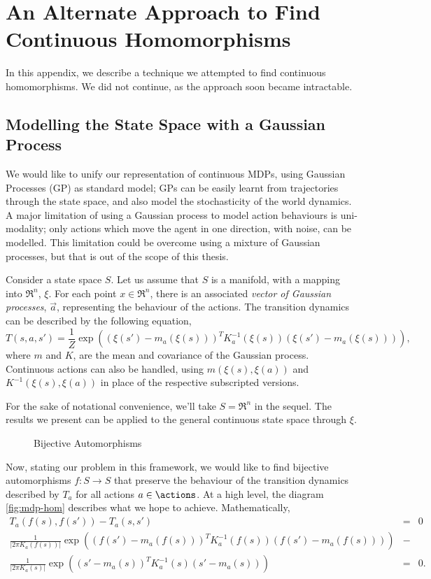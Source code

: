 \chapter{An Alternate Approach to Find Continuous Homomorphisms}
\label{chap:alt-hom-approaches}

In this appendix, we describe a technique we attempted to find
continuous homomorphisms. We did not continue, as the approach soon
became intractable.

\section{Modelling the State Space with a Gaussian Process}

We would like to unify our representation of continuous MDPs, using
Gaussian Processes (GP) as standard model; GPs can be easily learnt from
trajectories through the state space, and also model the stochasticity
of the world dynamics. A major limitation of using a Gaussian process to
model action behaviours is uni-modality; only actions which move the
agent in one direction, with noise, can be modelled. This limitation
could be overcome using a mixture of Gaussian processes, but that is out
of the scope of this thesis.

Consider a state space $S$. Let us assume that $S$ is a manifold, with
a mapping into $\Re^n$, $\xi$. For each point $x \in \Re^n$, there is an
associated {\em vector of Gaussian processes}, $\vec{a}$, representing
the behaviour of the actions. The transition dynamics can be described
by the following equation, $$T(s,a,s') = \frac{1}{Z} \exp( (\xi(s')
- m_a(\xi(s)))^T K^{-1}_a(\xi(s)) (\xi(s') - m_a(\xi(s)))),$$ where $m$
and $K$, are the mean and covariance of the Gaussian process. Continuous
actions can also be handled, using $m(\xi(s),\xi(a))$ and
$K^{-1}(\xi(s), \xi(a))$ in place of the respective subscripted
versions.

For the sake of notational convenience, we'll take $S = \Re^n$ in the
sequel. The results we present can be applied to the general continuous
state space through $\xi$.

\begin{figure}[h]
\centering

\caption{Bijective Automorphisms}
\label{fig:mdp-hom}
\end{figure}

Now, stating our problem in this framework, we would like to find
bijective automorphisms $f : S \to S$ that preserve the behaviour of the
transition dynamics described by $T_a$ for all actions $a \in \actions$.
At a high level, the diagram \autoref{fig:mdp-hom} describes what we
hope to achieve. Mathematically,
\begin{eqnarray*}
T_a(f(s),f(s')) -  T_a(s,s') &=& 0 \\
\frac{1}{|2\pi K_a(f(s))|} \exp((f(s') - m_a(f(s)))^T K^{-1}_a(f(s)) (f(s') - m_a(f(s)))) &-& \\
 \frac{1}{|2\pi K_a(s)|} \exp((s' - m_a(s))^T K^{-1}_a(s) (s' - m_a(s))) &=& 0.
\end{eqnarray*}

